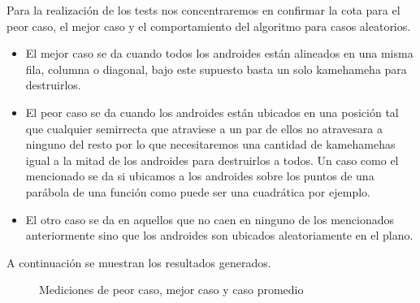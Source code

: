 Para la realización de los tests nos concentraremos en confirmar la cota para el peor caso, el mejor caso y el comportamiento del algoritmo para casos aleatorios.

\begin{itemize}
\item El mejor caso se da cuando todos los androides están alineados en una misma fila, columna o diagonal, bajo este supuesto basta un solo kamehameha para destruirlos.
\item El peor caso se da cuando los androides están ubicados en una posición tal que cualquier semirrecta que atraviese a un par de ellos no atravesara a ninguno del resto por lo que necesitaremos una cantidad de kamehamehas igual a la mitad de los androides para destruirlos a todos. Un caso como el mencionado se da si ubicamos a los androides sobre los puntos de una parábola de una función como puede ser una cuadrática por ejemplo.
\item El otro caso se da en aquellos que no caen en ninguno de los mencionados anteriormente sino que los androides son ubicados aleatoriamente en el plano.
\end{itemize}

A continuación se muestran los resultados generados.

\begin{figure}[h]
	\begin{center}
	\end{center}
	\caption{Mediciones de peor caso, mejor caso y caso promedio}
\end{figure}
